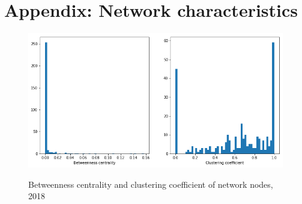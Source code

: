 \section{Appendix: Network characteristics}
\label{app: Network characteristics}
\begin{figure}[H]
  \centering
  \caption{Betweenness centrality and clustering coefficient of network nodes, 2018}
    \includegraphics[width=1 \textwidth]{Exam/Figures/Btwns_CC.png}
  \label{fig:Btwns_CC}
\end{figure}